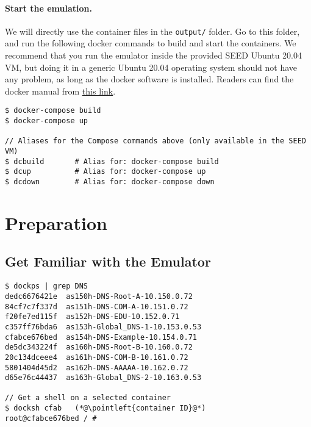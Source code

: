\paragraph{Start the emulation.}
We will directly use the container files in the \texttt{output/} folder.
Go to this folder, and run the following docker commands
to build and start the containers. We recommend that you run the emulator inside
the provided SEED Ubuntu 20.04 VM, but doing it in a generic Ubuntu 20.04 operating system
should not have any problem, as long as the docker software is installed.
Readers can find the docker manual from
\href{https://github.com/seed-labs/seed-labs/blob/master/manuals/docker/SEEDManual-Container.md}
{\underline{this link}}.

\begin{lstlisting}
$ docker-compose build
$ docker-compose up

// Aliases for the Compose commands above (only available in the SEED VM)
$ dcbuild       # Alias for: docker-compose build
$ dcup          # Alias for: docker-compose up
$ dcdown        # Alias for: docker-compose down
\end{lstlisting}








\section{Preparation}



\subsection{Get Familiar with the Emulator} 

\begin{lstlisting}
$ dockps | grep DNS
dedc6676421e  as150h-DNS-Root-A-10.150.0.72
84cf7c7f337d  as151h-DNS-COM-A-10.151.0.72
f20fe7ed115f  as152h-DNS-EDU-10.152.0.71
c357ff76bda6  as153h-Global_DNS-1-10.153.0.53
cfabce676bed  as154h-DNS-Example-10.154.0.71
de5dc343224f  as160h-DNS-Root-B-10.160.0.72
20c134dceee4  as161h-DNS-COM-B-10.161.0.72
5801404d45d2  as162h-DNS-AAAAA-10.162.0.72
d65e76c44437  as163h-Global_DNS-2-10.163.0.53

// Get a shell on a selected container
$ docksh cfab   (*@\pointleft{container ID}@*) 
root@cfabce676bed / #
\end{lstlisting}



